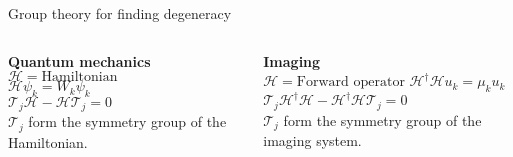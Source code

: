 \documentclass[presentation]{beamer}
\begin{document}
\begin{frame}[label=sec-1]{Group theory for finding degeneracy}
\begin{columns}
  \begin{column}{0.5\textwidth}
    \centering \textbf{Quantum mechanics}\\\vspace{2em}
    $\mathcal{H} = \text{Hamiltonian}$\\\vspace{2em}
    $\mathcal{H}\psi_k = W_k\psi_k$\\\vspace{2em}
    $\mathcal{T}_j\mathcal{H} - \mathcal{H}\mathcal{T}_j = 0$\\\vspace{2em}
    $\mathcal{T}_j$ form the symmetry group of the Hamiltonian.
\end{column}
\begin{column}{0.5\textwidth}  %
  \centering \textbf{Imaging}\\\vspace{2em}
  $\mathcal{H} = \text{Forward operator}$\vspace{2em}
  $\mathcal{H}^{\dagger}\mathcal{H}u_k = \mu_ku_k$\\\vspace{2em}
  $\mathcal{T}_j\mathcal{H}^{\dagger}\mathcal{H} - \mathcal{H}^{\dagger}\mathcal{H}\mathcal{T}_j = 0$\\\vspace{2em}
  $\mathcal{T}_j$ form the symmetry group of the imaging system.
  
\end{column}
\end{columns}
\end{frame}
\end{document}
